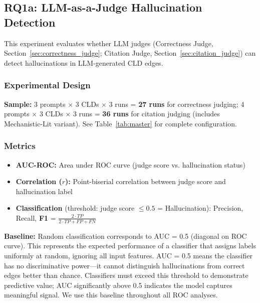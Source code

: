 \subsection{RQ1a: LLM-as-a-Judge Hallucination Detection}
\label{sec:rq1a_experiments}

This experiment evaluates whether LLM judges (Correctness Judge, Section~\ref{sec:correctness_judge}; Citation Judge, Section~\ref{sec:citation_judge}) can detect hallucinations in LLM-generated CLD edges.

\subsubsection{Experimental Design}
\textbf{Sample:} 3 prompts $\times$ 3 CLDs $\times$ 3 runs = \textbf{27 runs} for correctness judging; 4 prompts $\times$ 3 CLDs $\times$ 3 runs = \textbf{36 runs} for citation judging (includes Mechanistic-Lit variant). See Table~\ref{tab:master} for complete configuration.

\subsubsection{Metrics}
\begin{itemize}[noitemsep]
    \item \textbf{AUC-ROC:} Area under ROC curve (judge score vs. hallucination status)
    \item \textbf{Correlation ($r$):} Point-biserial correlation between judge score and hallucination label
    \item \textbf{Classification} (threshold: judge score $\leq 0.5$ = Hallucination): Precision, Recall, \textbf{F1} = $\frac{2 \cdot TP}{2 \cdot TP + FP + FN}$
\end{itemize}

\textbf{Baseline:} Random classification corresponds to AUC = 0.5 (diagonal on ROC curve). This represents the expected performance of a classifier that assigns labels uniformly at random, ignoring all input features. AUC = 0.5 means the classifier has no discriminative power---it cannot distinguish hallucinations from correct edges better than chance. Classifiers must exceed this threshold to demonstrate predictive value; AUC significantly above 0.5 indicates the model captures meaningful signal. We use this baseline throughout all ROC analyses.

